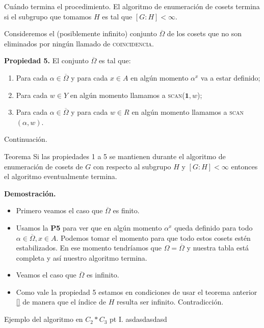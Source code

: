 \documentclass[aspectratio=169, 9pt]{beamer}
\newcommand{\coin}{\textsc{coincidencia}}
\newcommand{\scan}{\textsc{scan}}
\newcommand{\ol}{\overline}
\begin{document}
\begin{frame}[fragile]{Cuándo termina el procedimiento.}
	El algoritmo de enumeración de cosets termina si el subgrupo que tomamos $H$ es tal que $[G:H] < \infty$.
	\pause

	Consideremos el (posiblemente infinito) conjunto $\ol \Omega$ de los cosets que no son eliminados por ningún llamado de \coin.

	\pause
	
	\textbf{Propiedad 5.} El conjunto $\ol \Omega$ es tal que:
	\begin{enumerate}
		\item Para cada $\alpha \in \overline \Omega$ y para cada $x \in A$ en algún momento $\alpha^x$ va a estar definido;
		\item Para cada $w \in Y$ en algún momento llamamos a \scan($\textbf{1},w$);
		\item Para cada $\alpha \in \ol \Omega$ y para cada $w \in R$ en algún momento llamamos a \scan$(\alpha, w)$.
	\end{enumerate}
\end{frame}

\begin{frame}[fragile]{Continuación.}
	\begin{alertblock}{Teorema}
		Si las propiedades 1 a 5 se mantienen durante el algoritmo de enumeración de cosets de $G$ con respecto al subgrupo $H$ y $[G:H] < \infty$ entonces el algoritmo eventualmente termina.
	\end{alertblock}
	\pause
	
	
	\textbf{Demostración.} 
	\begin{itemize}
		\item Primero veamos el caso que $\ol \Omega$ es finito.
		\pause
		\item Usamos la \textbf{P5} para ver que en algún momento $\alpha^x$ queda definido para todo $\alpha \in \ol\Omega, x \in A$.
		\pause 
		Podemos tomar el momento para que todo estos cosets estén estabilizados.
		\pause
		En ese momento tendríamos que $\Omega = \ol \Omega$ y nuestra tabla está completa y así nuestro algoritmo termina.
		\item Veamos el caso que $\ol \Omega$ es infinito.
		\pause
		\item Como vale la propiedad 5 estamos en condiciones de usar el teorema anterior \ref{} de manera que el índice de $H$ resulta ser infinito.
		Contradicción.
	\end{itemize}
\end{frame}

\begin{frame}[fragile]{Ejemplo del algoritmo en $C_2 \ast C_3$ pt I.}
asdasdasdasd
\end{frame}
\end{document}
